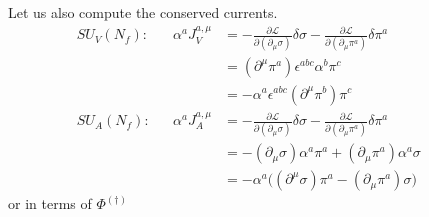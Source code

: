 Let us also compute the conserved currents.
\begin{subequations}
    \begin{align}
        &&SU_V(N_f):&&\alpha^aJ_V^{a,\mu}&=-\frac{\partial\mathscr{L}}{\partial(\partial_\mu\sigma)}\delta\sigma-\frac{\partial\mathscr{L}}{\partial(\partial_\mu\pi^a)}\delta\pi^a&&&&\\
        &&&&&=(\partial^\mu\pi^a)\epsilon^{abc}\alpha^b\pi^c\\
        &&&&&=-\alpha^a\epsilon^{abc}(\partial^\mu\pi^b)\pi^c\\
        &&SU_A(N_f):&&\alpha^aJ_A^{a,\mu}&=-\frac{\partial\mathscr{L}}{\partial(\partial_\mu\sigma)}\delta\sigma-\frac{\partial\mathscr{L}}{\partial(\partial_\mu\pi^a)}\delta\pi^a&&&&\\
        &&&&&=-(\partial_\mu\sigma)\alpha^a\pi^a+(\partial_\mu\pi^a)\alpha^a\sigma\\
        &&&&&=-\alpha^a\big((\partial^\mu\sigma)\pi^a-(\partial_\mu\pi^a)\sigma\big)
    \end{align}
\end{subequations}
or in terms of $\Phi^{(\dagger)}$
